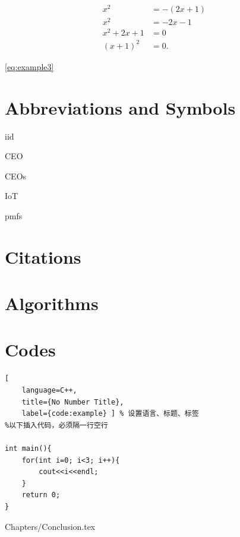 \begin{align}
x^2 &= -(2x +1) \\
x^2 &= -2x -1 \nonumber\\
x^2+2x +1 &= 0 \label{eq:example2}\\
(x+1)^2 &=0 \label{eq:example3}.
\end{align}

\eqref{eq:example3}


\section{Abbreviations and Symbols}
\gls{iid}


\Gls{CEO}


\glspl{CEO}

\gls{IoT}


\Glspl{pmf}

\section{Citations}
\cite{berger1978multiterminal}

\cite{berrou1996near,shannon1959coding,el2011network,mp3standard}

\cite{el2011network,berger1978multiterminal}

\cite{Tung1978multiterminal}

\section{Algorithms}
\begin{algorithm}
\caption{An Example}
\label{alg:example}
\begin{algorithmic}

	\ENDFOR
\ELSE
	\ENDFOR 
\ENDIF
\end{algorithmic}
\end{algorithm}


\section{Codes}
\begin{lstlisting}[
	language=C++,
	title={No Number Title},
	label={code:example} ] % 设置语言、标题、标签
%以下插入代码，必须隔一行空行

int main(){
	for(int i=0; i<3; i++){
		cout<<i<<endl;
	}
	return 0;
}
\end{lstlisting}


	{Chapters/Conclusion.tex} %

